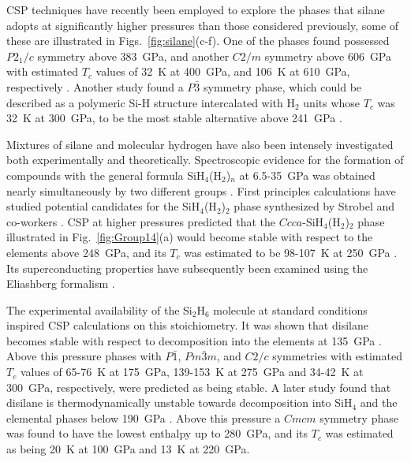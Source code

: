 \documentclass[12pt,letterpaper,oneside]{article}
\begin{document}
CSP techniques have recently been employed to explore the phases that silane adopts at significantly higher pressures than those considered previously, some of these are illustrated in Figs.\ \ref{fig:silane}(c-f). One of the phases found possessed  $P2_1/c$ symmetry above 383~GPa, and another $C2/m$ symmetry above 606~GPa with estimated $T_c$ values of 32~K at 400~GPa, and 106~K at 610~GPa, respectively \cite{Zhang:2015-Si}. Another study found a $P\bar{3}$ symmetry phase, which could be described as a polymeric Si-H structure intercalated with H$_2$ units whose $T_c$ was 32~K at 300~GPa, to be the most stable alternative above 241~GPa \cite{Cui:2015-Si}. 

Mixtures of silane and molecular hydrogen have also been intensely investigated both experimentally and theoretically. Spectroscopic evidence for the formation of compounds with the general formula SiH$_4$(H$_2$)$_n$ at 6.5-35~GPa was obtained nearly simultaneously by two different groups \cite{Strobel:2009a,Wang:2009-Si}. First principles calculations \cite{Yao:2010-Si,Yim-2010-Si,Michel:2010-Si,Shanavas:2012-Si} have studied potential candidates for the SiH$_4$(H$_2$)$_2$ phase synthesized by Strobel and co-workers \cite{Strobel:2009a}. CSP at higher pressures predicted that the $Ccca$-SiH$_4$(H$_2$)$_2$ phase illustrated in Fig.\ \ref{fig:Group14}(a) would become stable with respect to the elements above 248~GPa, and its $T_c$ was estimated to be 98-107~K at 250~GPa \cite{Li:2010-Si}. Its superconducting properties have subsequently been examined using the Eliashberg formalism \cite{Szcze:2013-Si,Durajski:2013-Si}. 

The experimental availability of the Si$_2$H$_6$ molecule at standard conditions inspired CSP calculations on this stoichiometry. It was shown that disilane becomes stable with respect to decomposition into the elements at 135~GPa \cite{Jin:2010-Si}. Above this pressure phases with $P\bar{1}$, $Pm\bar{3}m$, and $C2/c$ symmetries with estimated $T_c$ values of 65-76~K at 175~GPa, 139-153~K at 275~GPa and 34-42~K at 300~GPa, respectively, were predicted as being stable. A later study found that disilane is thermodynamically unstable towards decomposition into SiH$_4$ and the elemental phases below 190~GPa \cite{Flores:2012-Si}. Above this pressure a $Cmcm$ symmetry phase was found to have the lowest enthalpy up to 280~GPa, and its $T_c$ was estimated as being 20~K at 100~GPa and 13~K at 220~GPa. \\
\end{document}
